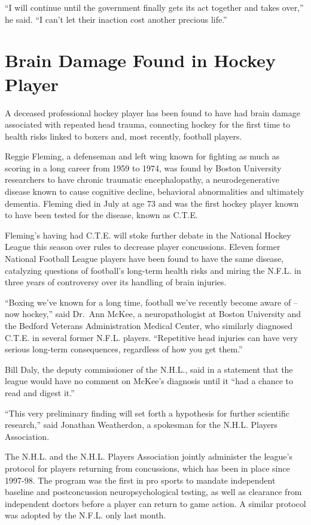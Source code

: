﻿\documentclass[12pt]{article}
\begin{document}
``I will continue until the government finally gets its act together and takes over,'' he said. ``I
can't let their inaction cost another precious life.''

\section{Brain Damage Found in Hockey Player}

\lettrine{A}{} deceased professional hockey player has been found to have
had brain damage associated with repeated head trauma, connecting hockey for the first time to
health risks linked to boxers and, most recently, football players.

Reggie Fleming, a defenseman and left wing known for fighting as much as scoring in a long career
from 1959 to 1974, was found by Boston University researchers to have chronic traumatic
encephalopathy, a neurodegenerative disease known to cause cognitive decline, behavioral
abnormalities and ultimately dementia. Fleming died in July at age 73 and was the first hockey
player known to have been tested for the disease, known as C.T.E.

Fleming's having had C.T.E. will stoke further debate in the National Hockey League this season over
rules to decrease player concussions. Eleven former National Football League players have been found
to have the same disease, catalyzing questions of football's long-term health risks and miring the
N.F.L. in three years of controversy over its handling of brain injuries.

``Boxing we've known for a long time, football we've recently become aware of -- now hockey,'' said
Dr.~Ann McKee, a neuropathologist at Boston University and the Bedford Veterans Administration
Medical Center, who similarly diagnosed C.T.E. in several former N.F.L. players. ``Repetitive head
injuries can have very serious long-term consequences, regardless of how you get them.''

Bill Daly, the deputy commissioner of the N.H.L., said in a statement that the league would have no
comment on McKee's diagnosis until it ``had a chance to read and digest it.''

``This very preliminary finding will set forth a hypothesis for further scientific research,'' said
Jonathan Weatherdon, a spokesman for the N.H.L. Players Association.

The N.H.L. and the N.H.L. Players Association jointly administer the league's protocol for players
returning from concussions, which has been in place since 1997-98. The program was the first in pro
sports to mandate independent baseline and postconcussion neuropsychological testing, as well as
clearance from independent doctors before a player can return to game action. A similar protocol was
adopted by the N.F.L. only last month.
\end{document}
